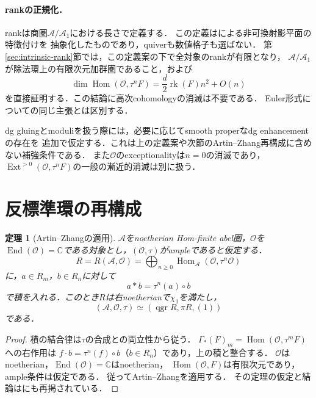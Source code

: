 \documentclass[11pt,a4paper]{ltjsarticle}
\newtheorem{theorem}{定理}[section]
\theoremstyle{definition}
\newcommand{\OO}{\mathcal O}
\renewcommand{\AA}{\mathcal A}
\newcommand{\Hom}{\operatorname{Hom}}
\newcommand{\End}{\operatorname{End}}
\newcommand{\Ext}{\operatorname{Ext}}
\newcommand{\qgr}{\operatorname{qgr}}
\newcommand{\rk}{\operatorname{rk}}
\begin{document}
\paragraph{rankの正規化．}
rankは商圏$\AA/\AA_1$における長さで定義する．
この定義は\cite[Proposition A.6]{AOUCompact}による非可換射影平面の特徴付けを
抽象化したものであり，quiverも数値格子も選ばない．
第\ref{sec:intrinsic-rank}節では，この定義案の下で全対象のrankが有限となり，
$\AA/\AA_1$が除法環上の有限次元加群圏であること，および
\[
 \dim\Hom(\OO,\tau^nF)=\frac d2\rk(F)n^2+O(n)
\]
を直接証明する．この結論に高次cohomologyの消滅は不要である．
Euler形式についての同じ主張とは区別する．

dg gluingとmoduliを扱う際には，必要に応じてsmooth properなdg enhancementの存在を
追加で仮定する．これは上の定義案や次節のArtin--Zhang再構成に含めない補強条件である．
また$\OO$のexceptionalityは$n=0$の消滅であり，
$\Ext^{>0}(\OO,\tau^nF)$の一般の漸近的消滅は別に扱う．

\section{反標準環の再構成}
\begin{theorem}[Artin--Zhangの適用]\label{thm:az}
$\AA$をnoetherian Hom-finite abel圏，$\OO$を
$\End(\OO)=\mathbb C$である対象とし，$(\OO,\tau)$がampleであると仮定する．
\begin{equation}\label{eq:orbit}
 R=R(\AA,\OO)=\bigoplus_{n\geq0}\Hom_{\AA}(\OO,\tau^n\OO)
\end{equation}
に，$a\in R_m$，$b\in R_n$に対して
\begin{equation}\label{eq:multiplication}
 a*b=\tau^n(a)\circ b
\end{equation}
で積を入れる．このとき$R$は右noetherianで$\chi_1$を満たし，
\begin{equation}\label{eq:az}
 (\AA,\OO,\tau)\simeq(\qgr R,\pi R,(1))
\end{equation}
である．
\end{theorem}
\begin{proof}
積の結合律は$\tau$の合成との両立性から従う．
$\Gamma_*(F)_m=\Hom(\OO,\tau^mF)$への右作用は
$f\cdot b=\tau^n(f)\circ b$（$b\in R_n$）であり，上の積と整合する．
$\OO$はnoetherian，$\End(\OO)=\mathbb C$はnoetherian，
$\Hom(\OO,F)$は有限次元であり，ample条件は仮定である．
従ってArtin--Zhang\cite[Theorem 4.5(1)]{AZ}を適用する．
その定理の仮定と結論は\cite[Theorem 7.3]{Orbifold}にも再掲されている．
\end{proof}
\end{document}
